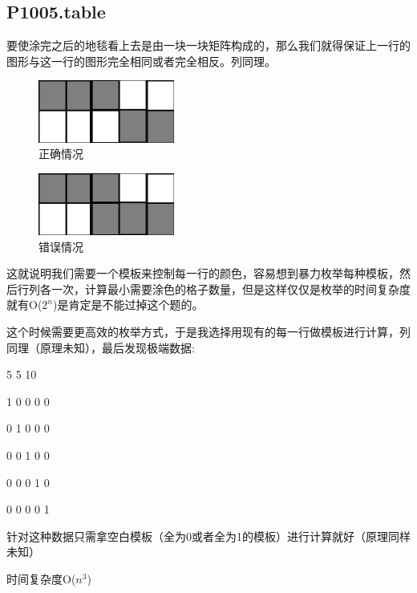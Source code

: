 \documentclass[UTF8]{ctexart}
\begin{document}
	\subsection*{P1005.table}
	要使涂完之后的地毯看上去是由一块一块矩阵构成的，那么我们就得保证上一行的图形与这一行的图形完全相同或者完全相反。列同理。
	\begin{figure}[!htb]
		\centering
		\includegraphics[height=0.1\textheight,width=0.4\textwidth]{p10051}
		\caption{正确情况}
	\end{figure}
	\begin{figure}[!htb]
		\centering
		\includegraphics[height=0.1\textheight,width=0.4\textwidth]{p10052}
		\caption{错误情况}
	\end{figure}
	
	这就说明我们需要一个模板来控制每一行的颜色，容易想到暴力枚举每种模板，然后行列各一次，计算最小需要涂色的格子数量，但是这样仅仅是枚举的时间复杂度就有O($2^n$)是肯定是不能过掉这个题的。
	
	这个时候需要更高效的枚举方式，于是我选择用现有的每一行做模板进行计算，列同理（原理未知），最后发现极端数据:
	
	5 5 10
	
	1 0 0 0 0 
	
	0 1 0 0 0
	
	0 0 1 0 0 
	
	0 0 0 1 0
	
	0 0 0 0 1
	
	针对这种数据只需拿空白模板（全为0或者全为1的模板）进行计算就好（原理同样未知）
	
	时间复杂度O($n^3$)
	
\end{document}
